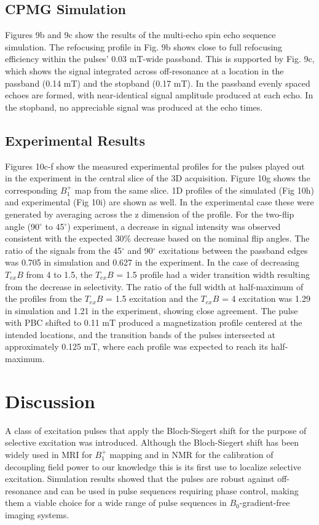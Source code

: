 \documentclass[a4paper,12pt]{article}
\begin{document}
\subsection*{CPMG Simulation}
Figures 9b and 9c show the results of the multi-echo spin echo sequence simulation.
The refocusing profile in Fig. 9b shows close to full refocusing efficiency within the pulses' 0.03 mT-wide passband. 
This is supported by Fig. 9c, 
which shows the signal integrated across off-resonance at a location in the passband (0.14 mT) and the stopband (0.17 mT). 
In the passband evenly spaced echoes are formed, with near-identical signal amplitude produced at each echo. 
In the stopband, no appreciable signal was produced at the echo times. 

\subsection*{Experimental Results}
Figures 10c-f show the measured experimental profiles for the pulses played out in the experiment in the central slice of the 3D acquisition. 
Figure 10g shows the corresponding $B_1^+$ map from the same slice. 
1D profiles of the simulated (Fig 10h) and experimental (Fig 10i) are shown as well. 
In the experimental case these were generated by averaging across the z dimension of the profile.
For the two-flip angle (90$^\circ$ to 45$^\circ$) experiment, 
a decrease in signal intensity was observed consistent with the expected 30\% decrease based on the nominal flip angles. 
The ratio of the signals from the 45$^\circ$ and 90$^\circ$ excitations between the passband edges was 0.705 in simulation and 0.627 in the experiment.  
In the case of decreasing $T_{ex}B$ from 4 to 1.5, 
the $T_{ex}B$ = 1.5 profile had a wider transition width resulting from the decrease in selectivity.
The ratio of the full width at half-maximum of the profiles from the $T_{ex}B$ = 1.5 excitation and the $T_{ex}B$ = 4 excitation was 1.29 in simulation and 1.21 in the experiment, 
showing close agreement. 
The pulse with PBC shifted to 0.11 mT produced a magnetization profile centered at the intended locations, 
and the transition bands of the pulses intersected at approximately 0.125 mT, 
where each profile was expected to reach its half-maximum.

\section*{Discussion}
A class of excitation pulses that apply the Bloch-Siegert shift for the purpose of selective excitation
was introduced.
Although the Bloch-Siegert shift has been widely used in MRI for $B_1^+$ mapping \cite{Sacolick2010B1Shift, KhalighiAdiabaticMapping} and in NMR for the calibration of decoupling field power \cite{Claridge2016High-ResolutionEdition,Hung2020UsingSample} 
to our knowledge this is its first use to localize selective excitation.
Simulation results showed that the pulses are robust against off-resonance and can  be used in pulse sequences requiring phase control, 
making them a viable choice for a wide range of pulse sequences in $B_0$-gradient-free imaging systems.
\end{document}
